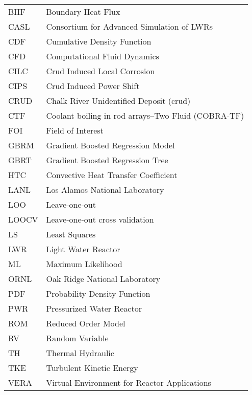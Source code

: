 

\acronyms
\begin{tabular}{l l}
BHF & Boundary Heat Flux \\
CASL & Consortium for Advanced Simulation of LWRs \\
CDF  & Cumulative Density Function \\
CFD &  Computational Fluid Dynamics \\
CILC & Crud Induced Local Corrosion \\
CIPS & Crud Induced Power Shift \\
CRUD & Chalk River Unidentified Deposit (crud) \\
CTF &  Coolant boiling in rod arrays–Two Fluid (COBRA-TF) \\
FOI &  Field of Interest \\
GBRM & Gradient Boosted Regression Model \\
GBRT & Gradient Boosted Regression Tree \\
HTC  & Convective Heat Transfer Coefficient \\
LANL & Los Alamos National Laboratory \\
LOO & Leave-one-out \\
LOOCV & Leave-one-out cross validation \\
LS  &  Least Squares \\
LWR & Light Water Reactor \\
ML  &  Maximum Likelihood \\
ORNL & Oak Ridge National Laboratory \\
PDF  &  Probability Density Function \\
PWR  & Pressurized Water Reactor \\
ROM &  Reduced Order Model \\
RV  & Random Variable \\
TH  &  Thermal Hydraulic \\
TKE &  Turbulent Kinetic Energy \\
VERA & Virtual Environment for Reactor Applications \\
\end{tabular}

